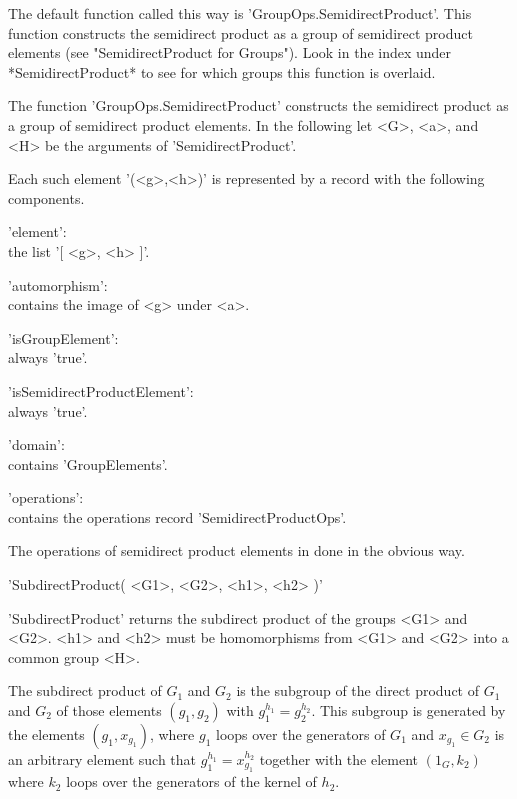 The  default  function called  this way is  'GroupOps.SemidirectProduct'.
This function constructs the semidirect  product as a group of semidirect
product elements (see "SemidirectProduct for Groups").  Look in the index
under  *SemidirectProduct*  to see  for  which groups  this  function  is
overlaid.

%

The  function   'GroupOps.SemidirectProduct'  constructs  the  semidirect
product as a group of semidirect product  elements.  In the following let
<G>, <a>, and <H> be the arguments of 'SemidirectProduct'.

Each  such  element  '(<g>,<h>)'  is represented  by a  record  with  the
following components.

'element': \\
        the list '[ <g>, <h> ]'.

'automorphism': \\
        contains the image of <g> under <a>.

'isGroupElement': \\
        always 'true'.

'isSemidirectProductElement': \\
        always 'true'.

'domain': \\
        contains 'GroupElements'.

'operations': \\
        contains the operations record 'SemidirectProductOps'.

The operations of semidirect product elements in done in the obvious way.


'SubdirectProduct( <G1>, <G2>, <h1>, <h2> )'

'SubdirectProduct' returns  the subdirect product of the  groups <G1> and
<G2>.   <h1> and <h2> must be homomorphisms from  <G1>  and  <G2> into  a
common group <H>.

The subdirect product of $G_1$ and $G_2$ is  the  subgroup of  the direct
product of $G_1$ and $G_2$ of those elements  $(g_1,g_2)$ with $g_1^{h_1}
=   g_2^{h_2}$.    This   subgroup   is   generated   by   the   elements
$(g_1,x_{g_1})$,  where $g_1$  loops over  the  generators  of $G_1$  and
$x_{g_1}  \in  G_2$  is  an  arbitrary  element  such  that $g_1^{h_1}  =
x_{g_1}^{h_2}$ together with  the  element $(1_G,k_2)$  where $k_2$ loops
over the generators of the kernel of $h_2$.

